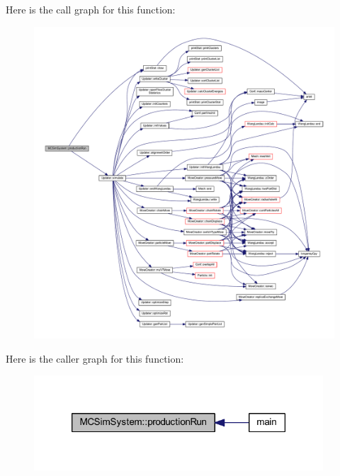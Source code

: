 Here is the call graph for this function\+:
\nopagebreak
\begin{figure}[H]
\begin{center}
\leavevmode
\includegraphics[width=350pt]{class_m_c_sim_system_a188410921d582e9a2659627f4ca2073b_cgraph}
\end{center}
\end{figure}




Here is the caller graph for this function\+:\nopagebreak
\begin{figure}[H]
\begin{center}
\leavevmode
\includegraphics[width=306pt]{class_m_c_sim_system_a188410921d582e9a2659627f4ca2073b_icgraph}
\end{center}
\end{figure}




